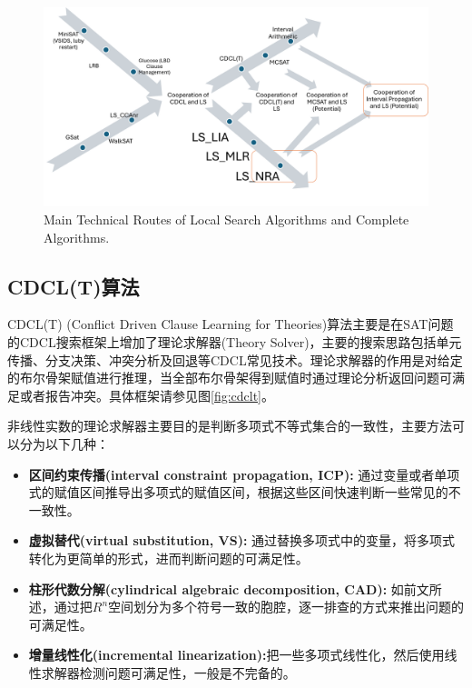 \begin{figure}[t]
    \centering
    \includegraphics[width=\columnwidth]{Img/future.png}
     {Main Technical Routes of Local Search Algorithms and Complete Algorithms.}
\label{fig:tech}
\end{figure}

\subsection{CDCL(T)算法}
CDCL(T) (Conflict Driven Clause Learning for Theories)算法主要是在SAT问题的CDCL搜索框架上增加了理论求解器(Theory Solver)，主要的搜索思路包括单元传播、分支决策、冲突分析及回退等CDCL常见技术。理论求解器的作用是对给定的布尔骨架赋值进行推理，当全部布尔骨架得到赋值时通过理论分析返回问题可满足或者报告冲突。具体框架请参见图\ref{fig:cdclt}。

非线性实数的理论求解器主要目的是判断多项式不等式集合的一致性，主要方法可以分为以下几种：
\begin{itemize}
    \item \textbf{区间约束传播(interval constraint propagation, ICP):} 通过变量或者单项式的赋值区间推导出多项式的赋值区间，根据这些区间快速判断一些常见的不一致性。
    \item \textbf{虚拟替代(virtual substitution, VS):} 通过替换多项式中的变量，将多项式转化为更简单的形式，进而判断问题的可满足性。
    \item \textbf{柱形代数分解(cylindrical algebraic decomposition, CAD):} 如前文所述，通过把$R^n$空间划分为多个符号一致的胞腔，逐一排查的方式来推出问题的可满足性。
    \item \textbf{增量线性化(incremental linearization):}把一些多项式线性化，然后使用线性求解器检测问题可满足性，一般是不完备的。
\end{itemize}

